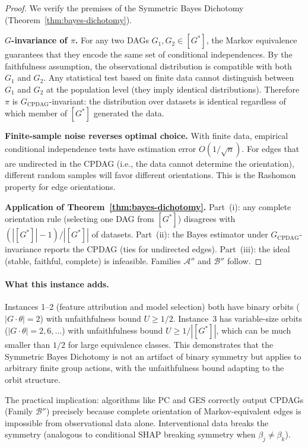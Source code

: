 \documentclass{article}
\begin{document}
\begin{proof}
We verify the premises of the Symmetric Bayes Dichotomy
(Theorem~\ref{thm:bayes-dichotomy}).

\textbf{$G$-invariance of $\pi$.}
For any two DAGs $G_1, G_2 \in [G^*]$, the Markov equivalence
guarantees that they encode the same set of conditional independences.
By the faithfulness assumption, the observational distribution is
compatible with both $G_1$ and $G_2$. Any statistical test based on
finite data cannot distinguish between $G_1$ and $G_2$ at the
population level (they imply identical distributions). Therefore $\pi$
is $G_{\text{CPDAG}}$-invariant: the distribution over datasets is
identical regardless of which member of $[G^*]$ generated the data.

\textbf{Finite-sample noise reverses optimal choice.}
With finite data, empirical conditional independence tests have
estimation error $O(1/\sqrt{n})$. For edges that are undirected in the
CPDAG (i.e., the data cannot determine the orientation), different
random samples will favor different orientations. This is the Rashomon
property for edge orientations.

\textbf{Application of Theorem~\ref{thm:bayes-dichotomy}.}
Part~(i): any complete orientation rule (selecting one DAG from
$[G^*]$) disagrees with $(|[G^*]|-1)/|[G^*]|$ of datasets.
Part~(ii): the Bayes estimator under $G_{\text{CPDAG}}$-invariance
reports the CPDAG (ties for undirected edges).
Part~(iii): the ideal (stable, faithful, complete) is infeasible.
Families $\mathcal{A}''$ and $\mathcal{B}''$ follow.
\end{proof}

\paragraph{What this instance adds.}
Instances 1--2 (feature attribution and model selection) both have
binary orbits ($|G \cdot \theta| = 2$) with unfaithfulness bound
$U \geq 1/2$. Instance~3 has variable-size orbits
($|G \cdot \theta| = 2, 6, \ldots$) with unfaithfulness bound
$U \geq 1/|[G^*]|$, which can be much smaller than $1/2$ for large
equivalence classes. This demonstrates that the Symmetric Bayes
Dichotomy is not an artifact of binary symmetry but applies to
arbitrary finite group actions, with the unfaithfulness bound adapting
to the orbit structure.

The practical implication: algorithms like PC and GES correctly output
CPDAGs (Family $\mathcal{B}''$) precisely because complete orientation
of Markov-equivalent edges is impossible from observational data alone.
Interventional data breaks the symmetry (analogous to conditional SHAP
breaking symmetry when $\beta_j \neq \beta_k$).
\end{document}
